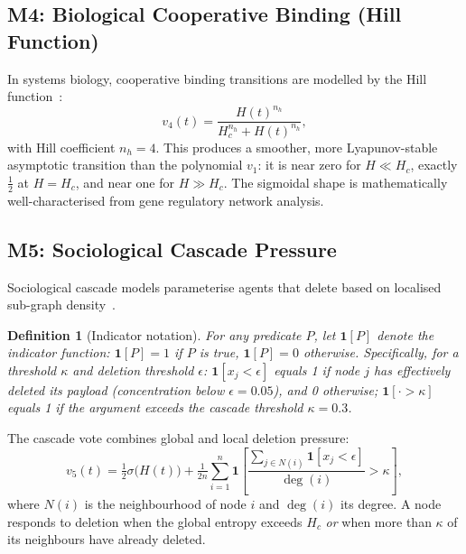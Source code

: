 \documentclass[review,12pt]{elsarticle}
\newcommand{\ind}{\mathbf{1}}       %
\newcommand{\Hc}{H_c}
\newtheorem{definition}{Definition}
\begin{document}
\subsection{M4: Biological Cooperative Binding (Hill Function)}

In systems biology, cooperative binding transitions are modelled by the
Hill function~\cite{alon2019systems}:
\begin{equation}
  v_4(t) = \frac{H(t)^{n_h}}{H_c^{n_h} + H(t)^{n_h}},
  \label{eq:hill}
\end{equation}
with Hill coefficient $n_h = 4$. This produces a smoother, more
Lyapunov-stable asymptotic transition than the polynomial $v_1$: it is
near zero for $H \ll \Hc$, exactly $\tfrac{1}{2}$ at $H = \Hc$, and
near one for $H \gg \Hc$. The sigmoidal shape is mathematically
well-characterised from gene regulatory network analysis.

\subsection{M5: Sociological Cascade Pressure}

Sociological cascade models parameterise agents that delete based on
localised sub-graph density~\cite{watts2002simple,guilbeault2018complex}.

\begin{definition}[Indicator notation]
\label{def:indicator}
For any predicate $P$, let $\ind[P]$ denote the indicator function:
$\ind[P] = 1$ if $P$ is true, $\ind[P] = 0$ otherwise.
Specifically, for a threshold $\kappa$ and deletion threshold $\epsilon$:
$\ind[x_j < \epsilon]$ equals 1 if node $j$ has effectively deleted its
payload (concentration below $\epsilon = 0.05$), and 0 otherwise;
$\ind[\cdot > \kappa]$ equals 1 if the argument exceeds the cascade
threshold $\kappa = 0.3$.
\end{definition}

The cascade vote combines global and local deletion pressure:
\begin{equation}
  v_5(t) = \tfrac{1}{2}\sigma\!\bigl(H(t)\bigr)
           + \tfrac{1}{2n}\sum_{i=1}^{n}
  \ind\!\!\left[
    \frac{\sum_{j \in N(i)}\ind[x_j < \epsilon]}{\deg(i)}
    > \kappa
  \right],
  \label{eq:social}
\end{equation}
where $N(i)$ is the neighbourhood of node $i$ and $\deg(i)$ its degree.
A node responds to deletion when the global entropy exceeds $\Hc$
\emph{or} when more than $\kappa$ of its neighbours have already deleted.
\end{document}
